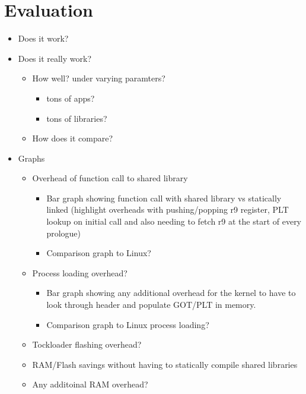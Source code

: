 \documentclass{article}
\begin{document}
\section*{Evaluation}
\begin{itemize}
    \item Does it work?
    \item Does it really work?
        \begin{itemize}
            \item How well? under varying paramters?
            \begin{itemize}
                \item tons of apps?
                \item tons of libraries?
            \end{itemize}
            \item How does it compare?
        \end{itemize}
    \item Graphs
        \begin{itemize}
            \item Overhead of function call to shared library
                \begin{itemize}
                    \item Bar graph showing function call with shared library vs statically linked (highlight overheads with pushing/popping r9 register, PLT lookup on initial call and also needing to fetch r9 at the start of every prologue)
                    \item Comparison graph to Linux?
                \end{itemize}
            \item Process loading overhead? 
                \begin{itemize}
                    \item Bar graph showing any additional overhead for the kernel to have to look through header and populate GOT/PLT in memory.
                    \item Comparison graph to Linux process loading?
                \end{itemize}
            \item Tockloader flashing overhead? 
            \item RAM/Flash savings without having to statically compile shared libraries
            \item Any additoinal RAM overhead?
        \end{itemize}
\end{itemize}
\end{document}
